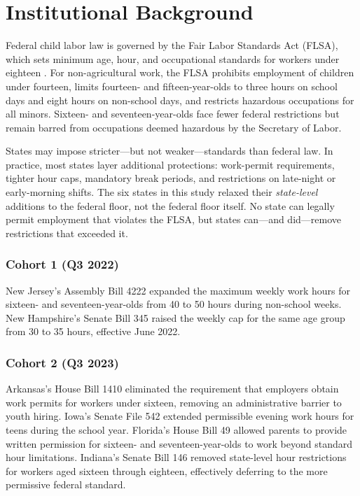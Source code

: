 \documentclass[12pt]{article}
\begin{document}
\section{Institutional Background}
\label{sec:background}

Federal child labor law is governed by the Fair Labor Standards Act (FLSA), which sets minimum age, hour, and occupational standards for workers under eighteen \citep{DOL2024childlabor}. For non-agricultural work, the FLSA prohibits employment of children under fourteen, limits fourteen- and fifteen-year-olds to three hours on school days and eight hours on non-school days, and restricts hazardous occupations for all minors. Sixteen- and seventeen-year-olds face fewer federal restrictions but remain barred from occupations deemed hazardous by the Secretary of Labor.

States may impose stricter---but not weaker---standards than federal law. In practice, most states layer additional protections: work-permit requirements, tighter hour caps, mandatory break periods, and restrictions on late-night or early-morning shifts. The six states in this study relaxed their \textit{state-level} additions to the federal floor, not the federal floor itself. No state can legally permit employment that violates the FLSA, but states can---and did---remove restrictions that exceeded it.

\subsubsection*{Cohort 1 (Q3 2022)} New Jersey's Assembly Bill 4222 expanded the maximum weekly work hours for sixteen- and seventeen-year-olds from 40 to 50 hours during non-school weeks. New Hampshire's Senate Bill 345 raised the weekly cap for the same age group from 30 to 35 hours, effective June 2022.

\subsubsection*{Cohort 2 (Q3 2023)} Arkansas's House Bill 1410 eliminated the requirement that employers obtain work permits for workers under sixteen, removing an administrative barrier to youth hiring. Iowa's Senate File 542 extended permissible evening work hours for teens during the school year. Florida's House Bill 49 allowed parents to provide written permission for sixteen- and seventeen-year-olds to work beyond standard hour limitations. Indiana's Senate Bill 146 removed state-level hour restrictions for workers aged sixteen through eighteen, effectively deferring to the more permissive federal standard.
\end{document}
